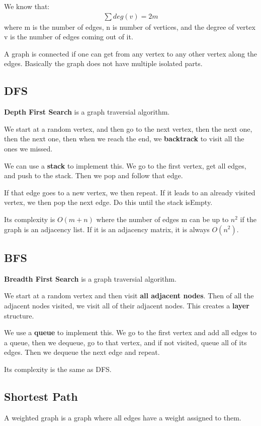 \documentclass[12pt,letterpaper]{article} \usepackage{amsmath} \usepackage{graphicx} \usepackage[margin=1in]{geometry} \usepackage{longtable}  \usepackage{amssymb}
\begin{document}
	We know that:
	\begin{align*}
		\sum deg(v) = 2m
	\end{align*}
	where m is the number of edges, n is number of vertices, and the degree of vertex v is the number of edges coming out of it. 
	
	A graph is connected if one can get from any vertex to any other vertex along the edges. Basically the graph does not have multiple isolated parts. 
	
	\subsection{DFS}
\textbf{	Depth First Search} is a graph traversial algorithm. 
	
	We start at a random vertex, and then go to the next vertex, then the next one, then the next one, then when we reach the end, we \textbf{backtrack} to visit all the ones we missed. 
	
	We can use a \textbf{stack} to implement this. We go to the first vertex, get all edges, and push to the stack. Then we pop and follow that edge. 
	
	If that edge goes to a new vertex, we then repeat. If it leads to an already visited vertex, we then pop the next edge. Do this until the stack isEmpty.
	
	Its complexity is $O(m+n)$ where the number of edges m can be up to $n^2$ if the graph is an adjacency list. If it is an adjacency matrix, it is always $O(n^2)$.
	
	\subsection{BFS}
\textbf{	Breadth First Search} is a graph traversial algorithm.
	
	We start at a random vertex and then visit \textbf{all adjacent nodes}. Then of all the adjacent nodes visited, we visit all of their adjacent nodes. This creates a \textbf{layer} structure. 
	
	We use a \textbf{queue} to implement this. We go to the first vertex and add all edges to a queue, then we dequeue, go to that vertex, and if not visited, queue all of its edges. Then we dequeue the next edge and repeat. 
	
	Its complexity is the same as DFS.
	
	\subsection{Shortest Path}
	A weighted graph is a graph where all edges have a weight assigned to them. 
	
\end{document}
